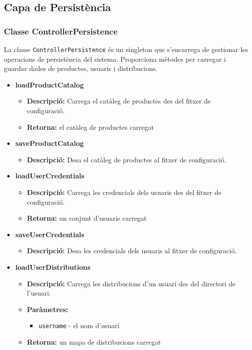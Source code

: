 \documentclass[a4paper, t]{article}
\begin{document}
\newpage
\subsection{Capa de Persistència}

\subsubsection{Classe ControllerPersistence} La classe \texttt{ControllerPersistence} és un singleton que s'encarrega de gestionar les operacions de persistència del sistema. Proporciona mètodes per carregar i guardar dades de productes, usuaris i distribucions.  \begin{itemize} \item \textbf{loadProductCatalog} \begin{itemize} \item \textbf{Descripció:} Carrega el catàleg de productes des del fitxer de configuració. \item \textbf{Retorna:} el catàleg de productes carregat \end{itemize}
\item \textbf{saveProductCatalog}
\begin{itemize}
    \item \textbf{Descripció:} Desa el catàleg de productes al fitxer de configuració.
\end{itemize}

\item \textbf{loadUserCredentials}
\begin{itemize}
    \item \textbf{Descripció:} Carrega les credencials dels usuaris des del fitxer de configuració.
    \item \textbf{Retorna:} un conjunt d'usuaris carregat
\end{itemize}

\item \textbf{saveUserCredentials}
\begin{itemize}
    \item \textbf{Descripció:} Desa les credencials dels usuaris al fitxer de configuració.
\end{itemize}

\item \textbf{loadUserDistributions}
\begin{itemize}
    \item \textbf{Descripció:} Carrega les distribucions d'un usuari des del directori de l'usuari.
    \item \textbf{Paràmetres:}
    \begin{itemize}
        \item \texttt{username} - el nom d'usuari
    \end{itemize}
    \item \textbf{Retorna:} un mapa de distribucions carregat
\end{itemize}


\end{itemize}
\end{document}
